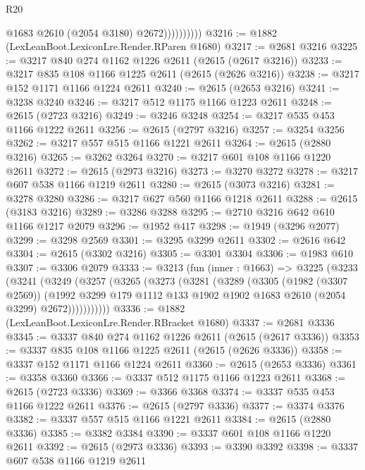 \begin{lexlean}{R20}
\begin{coremodule}
                        @1683
                        @2610
                        (@2054 @3180)
                        @2672))))))))))
@3216 := @1882 (LexLeanBoot.LexiconLre.Render.RParen @1680)
@3217 := @2681 @3216
@3225 := @3217 @840 @274 @1162 @1226 @2611 (@2615 (@2617 @3216))
@3233 := @3217 @835 @108 @1166 @1225 @2611 (@2615 (@2626 @3216))
@3238 := @3217 @152 @1171 @1166 @1224 @2611
@3240 := @2615 (@2653 @3216)
@3241 := @3238 @3240
@3246 := @3217 @512 @1175 @1166 @1223 @2611
@3248 := @2615 (@2723 @3216)
@3249 := @3246 @3248
@3254 := @3217 @535 @453 @1166 @1222 @2611
@3256 := @2615 (@2797 @3216)
@3257 := @3254 @3256
@3262 := @3217 @557 @515 @1166 @1221 @2611
@3264 := @2615 (@2880 @3216)
@3265 := @3262 @3264
@3270 := @3217 @601 @108 @1166 @1220 @2611
@3272 := @2615 (@2973 @3216)
@3273 := @3270 @3272
@3278 := @3217 @607 @538 @1166 @1219 @2611
@3280 := @2615 (@3073 @3216)
@3281 := @3278 @3280
@3286 := @3217 @627 @560 @1166 @1218 @2611
@3288 := @2615 (@3183 @3216)
@3289 := @3286 @3288
@3295 := @2710 @3216 @642 @610 @1166 @1217 @2079
@3296 := @1952 @417
@3298 := @1949 (@3296 @2077)
@3299 := @3298 @2569
@3301 := @3295 @3299 @2611
@3302 := @2616 @642
@3304 := @2615 (@3302 @3216)
@3305 := @3301 @3304
@3306 := @1983 @610
@3307 := @3306 @2079
@3333 := @3213
    (fun (inner : @1663) =>
    @3225
      (@3233
        (@3241
          (@3249
            (@3257
              (@3265
                (@3273
                  (@3281
                    (@3289
                      (@3305
                        (@1982 (@3307 @2569))
                        (@1992
                          @3299
                          @179
                          @1112
                          @133
                          @1902
                          @1902
                          @1683
                          @2610
                          (@2054 @3299)
                          @2672)))))))))))
@3336 := @1882 (LexLeanBoot.LexiconLre.Render.RBracket @1680)
@3337 := @2681 @3336
@3345 := @3337 @840 @274 @1162 @1226 @2611 (@2615 (@2617 @3336))
@3353 := @3337 @835 @108 @1166 @1225 @2611 (@2615 (@2626 @3336))
@3358 := @3337 @152 @1171 @1166 @1224 @2611
@3360 := @2615 (@2653 @3336)
@3361 := @3358 @3360
@3366 := @3337 @512 @1175 @1166 @1223 @2611
@3368 := @2615 (@2723 @3336)
@3369 := @3366 @3368
@3374 := @3337 @535 @453 @1166 @1222 @2611
@3376 := @2615 (@2797 @3336)
@3377 := @3374 @3376
@3382 := @3337 @557 @515 @1166 @1221 @2611
@3384 := @2615 (@2880 @3336)
@3385 := @3382 @3384
@3390 := @3337 @601 @108 @1166 @1220 @2611
@3392 := @2615 (@2973 @3336)
@3393 := @3390 @3392
@3398 := @3337 @607 @538 @1166 @1219 @2611

\end{coremodule}
\end{lexlean}

